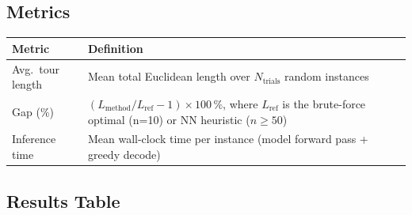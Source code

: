 \documentclass[12pt,a4paper]{article}
\begin{document}
\subsection*{Metrics}

\begin{center}
\begin{tabularx}{\linewidth}{lX}
\toprule
\textbf{Metric} & \textbf{Definition} \\
\midrule
Avg.\ tour length & Mean total Euclidean length over $N_{\mathrm{trials}}$
  random instances \\
Gap (\%) & $(L_{\mathrm{method}} / L_{\mathrm{ref}} - 1) \times 100\,\%$,
  where $L_{\mathrm{ref}}$ is the brute-force optimal (n=10)
  or NN heuristic ($n \geq 50$) \\
Inference time & Mean wall-clock time per instance (model forward pass
  + greedy decode) \\
\bottomrule
\end{tabularx}
\end{center}

\subsection*{Results Table}
\end{document}
